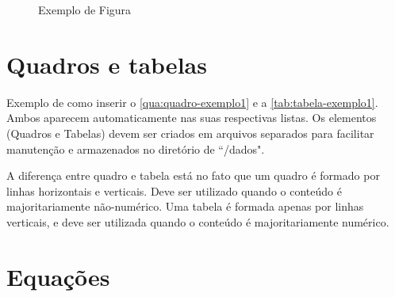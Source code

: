 \begin{figure}[!htb]
    \centering
    \caption{Exemplo de Figura}
    \begin{minipage}{\wd0}
        \vspace{-20pt}
        \label{fig:figura-exemplo-1}
    \end{minipage}
\end{figure}

\section{Quadros e tabelas}
\label{sec:quadrosTabelas}

Exemplo de como inserir o \autoref{qua:quadro-exemplo1} e a \cref{tab:tabela-exemplo1}. Ambos aparecem automaticamente nas suas respectivas listas.
Os elementos (Quadros e Tabelas) devem ser criados em arquivos separados para facilitar manutenção e armazenados no diretório de ``/dados".



A diferença entre quadro e tabela está no fato que um quadro é formado por linhas horizontais e verticais. Deve ser utilizado quando o conteúdo é majoritariamente não-numérico. Uma tabela é formada apenas por linhas verticais, e deve ser utilizada quando o conteúdo é majoritariamente numérico.



\section{Equações}
\label{sec:equacoes}

